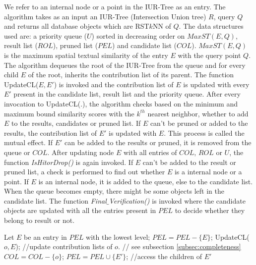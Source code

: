\documentclass[prodmode,letterpaper]{acmsmall}
\newcommand{\rstknn}{RST$k$NN\xspace}
\begin{document}
We refer to an internal node or a point in the IUR-Tree as an entry. The algorithm takes as an input an IUR-Tree (Intersection Union tree) $R$,
query $Q$ and returns all database objects which are \rstknn of $Q$. The data structures used are: a priority queue ($U$) sorted
in decreasing order on $MaxST(E,Q)$, result list ($ROL$), pruned list ($PEL$) and
candidate list ($COL$). $MaxST(E,Q)$ is the maximum spatial textual similarity of the entry $E$ with the query point $Q$. The
algorithm dequeues the root of the IUR-Tree from the queue and for every child $E$ of the root,  inherits the contribution list of its parent. The function UpdateCL($E,E'$) is invoked and the contribution list of $E$ is updated with every $E'$ present in the candidate list, result list and the priority queue. After every invocation to UpdateCL(.), the algorithm checks based on the minimum and maximum bound similarity scores with the $k^{th}$
nearest neighbor, whether to add $E$ to the results,
candidates or pruned list. If $E$ can't be pruned or added to the results, the contribution list of $E'$ is updated with $E$. This process is called the mutual effect. If $E'$ can be added to the results or pruned, it is removed from the queue or $COL$. After updating node $E$ with all entries of $COL$, $ROL$ or $U$, the function \textit{IsHitorDrop()} is again invoked. If $E$ can't be added to the result or pruned list, a check is performed to find out whether $E$ is a internal node or a point. If $E$ is an
internal node, it is added to the queue, else to the candidate list.
When the queue becomes empty, there might be some objects left in the
candidate list. The function \textit{Final$\_$Verification()} is invoked where the candidate objects are updated with all the entries present in $PEL$ to decide whether they
belong to result or not.
\begin{spacing}{0.8}
\begin{algorithm}[tp]
\begin{algorithmic}[1]
	\State Let $E$ be an entry in $PEL$ with the lowest level;
	\State $PEL=PEL-\lbrace E \rbrace$;
		\State UpdateCL($o,E$); //update contribution lists of $o$.
		 // see subsection \ref{subsec:completeness}
			\State $COL=COL-\lbrace o \rbrace$;
		\EndIf
	\EndFor
		\State $PEL=PEL \cup \lbrace E' \rbrace$; //access the children of $E'$ 	
	\EndFor
\EndWhile
\EndFunction
\end{algorithmic}
\end{algorithm}
\end{spacing}
\end{document}
